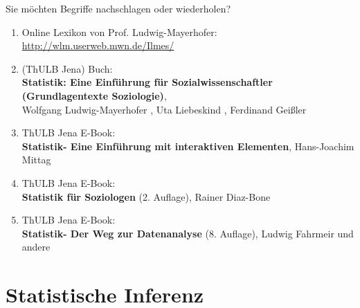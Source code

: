 \documentclass[usenames,dvipsnames,handout]{beamer}
\begin{document}
\begin{frame}{Sie möchten Begriffe  nachschlagen
oder wiederholen?}
\begin{enumerate}
\item{Online Lexikon von Prof. Ludwig-Mayerhofer: \url{http://wlm.userweb.mwn.de/Ilmes/}}\pause
\item{(ThULB Jena) Buch:\\ \textbf{Statistik: Eine Einführung für Sozialwissenschaftler (Grundlagentexte Soziologie)},\\
 Wolfgang Ludwig-Mayerhofer , Uta Liebeskind , Ferdinand Geißler }\pause
 \item{ThULB Jena E-Book: \\
 \textbf{Statistik-
 Eine Einführung mit interaktiven Elementen}, Hans-Joachim Mittag}\\ \pause
  \item{ThULB Jena E-Book: \\
   \textbf{Statistik für Soziologen} (2. Auflage), Rainer Diaz-Bone}\pause
   \item{ThULB Jena E-Book: \\
   \textbf{Statistik- Der Weg zur Datenanalyse} (8. Auflage), Ludwig Fahrmeir und andere}
\end{enumerate}
\end{frame}
\section{Statistische Inferenz}
\end{document}
